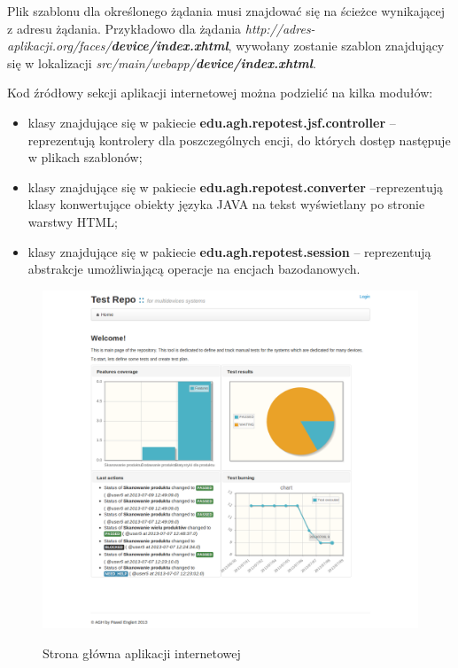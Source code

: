 Plik szablonu dla określonego żądania musi znajdować się na ścieżce wynikającej z adresu żądania. Przykładowo dla żądania \textit{http://adres-aplikacji.org/faces/\textbf{device/index.xhtml}}, wywołany zostanie szablon znajdujący się w lokalizacji \textit{src/main/webapp/\textbf{device/index.xhtml}}.

Kod źródłowy sekcji aplikacji internetowej można podzielić na kilka modułów:
\begin{itemize}
  \item klasy znajdujące się w pakiecie \textbf{edu.agh.repotest.jsf.controller} -- reprezentują kontrolery dla poszczególnych encji, do których dostęp następuje w plikach szablonów;
  \item klasy znajdujące się w pakiecie \textbf{edu.agh.repotest.converter} --reprezentują klasy konwertujące obiekty języka JAVA na tekst wyświetlany po stronie warstwy HTML;
  \item klasy znajdujące się w pakiecie \textbf{edu.agh.repotest.session} -- reprezentują abstrakcje umożliwiającą operacje na encjach bazodanowych.
   
\end{itemize}
\newpage

\begin{figure}[h!]
  \begin{center}
    \includegraphics[scale=0.4]{img/screen/Welcome.png}
    \label{fig:stronaGlowna}
    \caption{Strona główna aplikacji internetowej}
  \end{center}
\end{figure}

